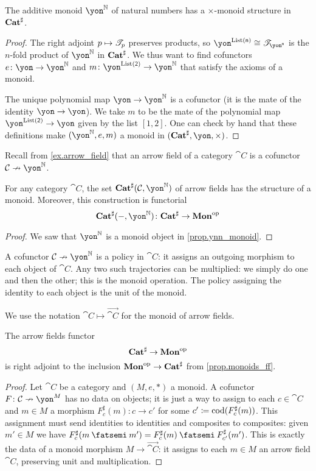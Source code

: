 \documentclass[Book-Poly]{subfiles}
\begin{document}
\begin{proposition}\label{prop.ynn_monoid}
The additive monoid $\yon^\nn$ of natural numbers has a $\times$-monoid structure in $\mathbf{Cat}^\sharp$.
\end{proposition}
\begin{proof}
The right adjoint $p\mapsto\mathscr{T}_{p}$ preserves products, so $\yon^{\List(\ord{n})}\cong\cofree{\yon^{\ord{n}}}$ is the $n$-fold product of $\yon^\nn$ in $\mathbf{Cat}^\sharp$. We thus want to find cofunctors $e\colon \yon\to\yon^\nn$ and $m\colon\yon^{\List(\2)}\to\yon^\nn$ that satisfy the axioms of a monoid. 

The unique polynomial map $\yon\to\yon^\nn$ is a cofunctor (it is the mate of the identity $\yon\to\yon$). We take $m$ to be the mate of the polynomial map $\yon^{\List(\2)}\to\yon$ given by the list $[1,2]$. One can check by hand that these definitions make $(\yon^\nn,e,m)$ a monoid in $(\smcat^\sharp,\yon,\times)$.
\end{proof}

Recall from \cref{ex.arrow_field} that an arrow field of a category $\cat{C}$ is a cofunctor $\cat{C}\cof\yon^\nn$.

\begin{corollary}
For any category $\cat{C}$, the set $\smcat^\sharp(\cat{C},\yon^\nn)$ of arrow fields has the structure of a monoid. Moreover, this construction is functorial
\[\smcat^\sharp(-,\yon^\nn)\colon\smcat^\sharp\to\Cat{Mon}\op\]
\end{corollary}
\begin{proof}
We saw that $\yon^\nn$ is a monoid object in \cref{prop.ynn_monoid}.
\end{proof}

A cofunctor $\cat{C}\cof\yon^\nn$ is a policy in $\cat{C}$: it assigns an outgoing morphism to each object of $\cat{C}$. Any two such trajectories can be multiplied: we simply do one and then the other; this is the monoid operation. The policy assigning the identity to each object is the unit of the monoid.

We use the notation $\cat{C}\mapsto\vec{\cat{C}}$ for the monoid of arrow fields.

\begin{theorem}\label{thm.catsharp_to_mon}
The arrow fields functor
\[\mathbf{Cat}^\sharp\to\mathbf{Mon}^{\textnormal{op}}\]
is right adjoint to the inclusion $\mathbf{Mon}^{\textnormal{op}}\to\mathbf{Cat}^\sharp$ from \cref{prop.monoids_ff}.
\end{theorem}
\begin{proof}
Let $\cat{C}$ be a category and $(M,e,*)$ a monoid. A cofunctor $F\colon\cat{C}\cof\yon^M$ has no data on objects; it is just a way to assign to each $c\in \cat{C}$ and $m\in M$ a morphism $F^\sharp_c(m)\colon c\to c'$ for some $c'\coloneqq\operatorname{cod}(F^\sharp_c(m))$. This assignment must send identities to identities and composites to composites: given $m'\in M$ we have $F^\sharp_c(m\then m')=F^\sharp_c(m)\then F^\sharp_{c'}(m')$. This is exactly the data of a monoid morphism $M\to \vec{\cat{C}}$: it assigns to each $m\in M$ an arrow field $\cat{C}$, preserving unit and multiplication.
\end{proof}
\end{document}
